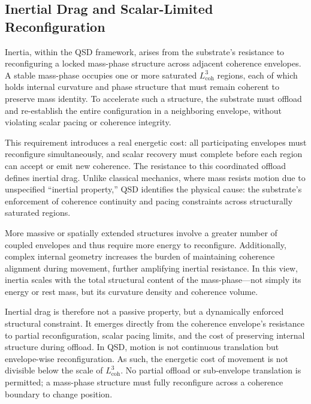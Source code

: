 \documentclass[entropy,article,submit,pdftex,moreauthors]{Definitions/mdpi}
\begin{document}
\subsection{Inertial Drag and Scalar-Limited Reconfiguration}
\label{sec:coherent-momentum-quantum}
Inertia, within the QSD framework, arises from the substrate's resistance to reconfiguring a locked mass-phase structure across adjacent coherence envelopes. A stable mass-phase occupies one or more saturated \texorpdfstring{\( L_{\text{coh}}^3 \)}{Lcoh\^{}3} regions, each of which holds internal curvature and phase structure that must remain coherent to preserve mass identity. To accelerate such a structure, the substrate must offload and re-establish the entire configuration in a neighboring envelope, without violating scalar pacing or coherence integrity.

This requirement introduces a real energetic cost: all participating envelopes must reconfigure simultaneously, and scalar recovery must complete before each region can accept or emit new coherence. The resistance to this coordinated offload defines inertial drag. Unlike classical mechanics, where mass resists motion due to unspecified “inertial property,” QSD identifies the physical cause: the substrate’s enforcement of coherence continuity and pacing constraints across structurally saturated regions.

More massive or spatially extended structures involve a greater number of coupled envelopes and thus require more energy to reconfigure. Additionally, complex internal geometry increases the burden of maintaining coherence alignment during movement, further amplifying inertial resistance. In this view, inertia scales with the total structural content of the mass-phase—not simply its energy or rest mass, but its curvature density and coherence volume.

Inertial drag is therefore not a passive property, but a dynamically enforced structural constraint. It emerges directly from the coherence envelope’s resistance to partial reconfiguration, scalar pacing limits, and the cost of preserving internal structure during offload. In QSD, motion is not continuous translation but envelope-wise reconfiguration. As such, the energetic cost of movement is not divisible below the scale of \texorpdfstring{\( L_{\text{coh}}^3 \)}{Lcoh\^{}3}. No partial offload or sub-envelope translation is permitted; a mass-phase structure must fully reconfigure across a coherence boundary to change position.
\end{document}
